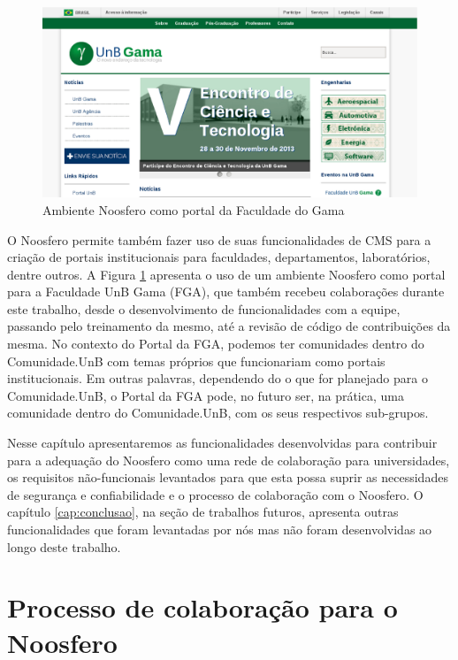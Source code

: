 \begin{figure}[h]
    \centering
    \includegraphics[keepaspectratio=true,scale=0.4]
      {figuras/portal-fga.eps}
    \caption{Ambiente Noosfero como portal da Faculdade do Gama}
    \label{portal-fga}
\end{figure}

O Noosfero permite também fazer uso de suas funcionalidades de CMS para a
criação de portais institucionais para faculdades, departamentos, laboratórios,
dentre outros. A Figura \ref{portal-fga} apresenta o uso de um ambiente
Noosfero como portal para a Faculdade UnB Gama (FGA), que também recebeu
colaborações durante este trabalho, desde o desenvolvimento de funcionalidades com a equipe,
passando pelo treinamento da mesmo, até a revisão de código de contribuições da mesma.
%
No contexto do Portal da FGA, podemos ter comunidades dentro do
Comunidade.UnB com temas próprios que funcionariam como portais institucionais.
%
Em outras palavras, dependendo do o que for planejado para o Comunidade.UnB, o
Portal da FGA pode, no futuro ser, na prática, uma comunidade dentro do Comunidade.UnB,
com os seus respectivos sub-grupos.

Nesse capítulo apresentaremos as funcionalidades desenvolvidas para contribuir
para a adequação do Noosfero como uma rede de colaboração para universidades,
os requisitos não-funcionais levantados para que esta possa suprir as
necessidades de segurança e confiabilidade e o processo de colaboração com o
Noosfero. O capítulo \ref{cap:conclusao}, na seção de trabalhos futuros,
apresenta outras funcionalidades que
foram levantadas por nós mas não foram desenvolvidas ao longo deste trabalho.

\section{Processo de colaboração para o Noosfero}

